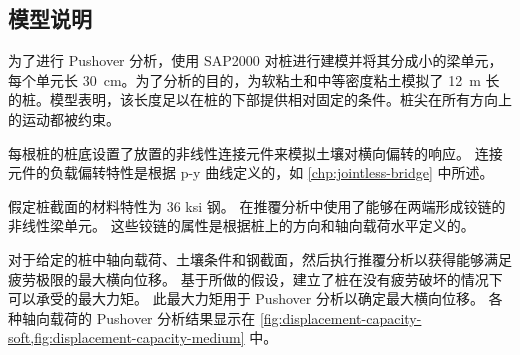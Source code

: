 \subsection{模型说明}
为了进行 Pushover 分析，使用 SAP2000 对桩进行建模并将其分成小的梁单元，每个单元长 \qty{30}{cm}。为了分析的目的，为软粘土和中等密度粘土模拟了 \qty{12}{m} 长的桩。模型表明，该长度足以在桩的下部提供相对固定的条件。桩尖在所有方向上的运动都被约束。

每根桩的桩底设置了放置的非线性连接元件来模拟土壤对横向偏转的响应。 连接元件的负载偏转特性是根据 p-y 曲线定义的，如 \cref{chp:jointless-bridge} 中所述。

假定桩截面的材料特性为 36 ksi 钢。 在推覆分析中使用了能够在两端形成铰链的非线性梁单元。 这些铰链的属性是根据桩上的方向和轴向载荷水平定义的。

对于给定的桩中轴向载荷、土壤条件和钢截面，然后执行推覆分析以获得能够满足疲劳极限的最大横向位移。 基于所做的假设，建立了桩在没有疲劳破坏的情况下可以承受的最大力矩。 此最大力矩用于 Pushover 分析以确定最大横向位移。 各种轴向载荷的 Pushover 分析结果显示在 \cref{fig:displacement-capacity-soft,fig:displacement-capacity-medium} 中。

